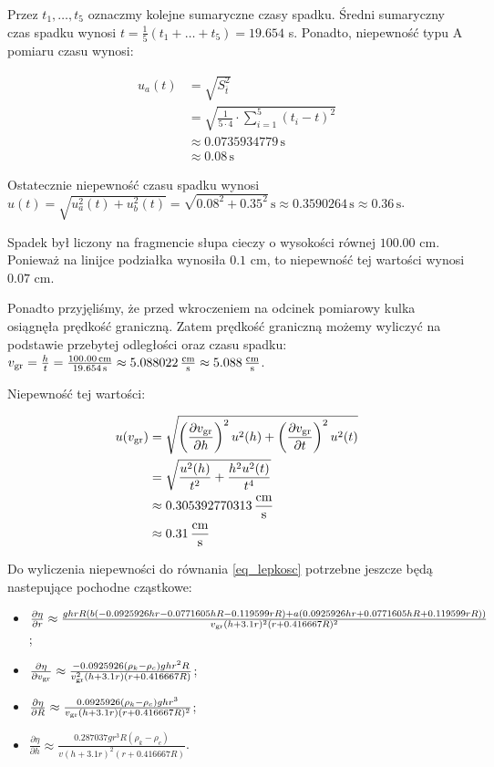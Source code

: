 \documentclass[a4paper]{article}
\begin{document}
Przez $t_1, \dots, t_5$ oznaczmy kolejne sumaryczne czasy spadku.
Średni sumaryczny czas spadku wynosi $t = \frac 1 5 (t_1 + \dots + t_5) = 19.654$ s.
Ponadto, niepewność typu A pomiaru czasu wynosi:

\begin{align*}
	u_a(t) &= \sqrt{S^{2}_{\overline{t}}} \\
	&= \sqrt{\frac{1}{5 \cdot 4} \cdot \sum_{i=1}^{5} (t_i - t)^2} \\
	&\approx 0.0735934779 \, \text{s} \\
	&\approx 0.08 \, \text{s}
\end{align*}

Ostatecznie niepewność czasu spadku wynosi $u(t) = \sqrt{u_a^2(t) + u_b^2(t)} = \sqrt{0.08^2 + 0.35^2} \, \text{s} \approx 0.3590264 \, \text{s} \approx 0.36\, \text{s}$.

Spadek był liczony na fragmencie słupa cieczy o wysokości równej $100.00$ cm.
Ponieważ na linijce podziałka wynosiła $0.1$ cm, to niepewność tej wartości wynosi $0.07$ cm.

Ponadto przyjęliśmy, że przed wkroczeniem na odcinek pomiarowy kulka osiągnęła prędkość graniczną.
Zatem prędkość graniczną możemy wyliczyć na podstawie przebytej odległości oraz czasu spadku:
$v_{\text{gr}} = \frac{h}{t} = \frac{100.00 \, \text{cm}}{19.654 \, \text{s}} \approx 5.088022 \, \frac{\text{cm}}{\text{s}} \approx 5.088 \, \frac{\text{cm}}{\text{s}}$.

Niepewność tej wartości:

\begin{align*}
	u(v_{\text{gr}}) &= \sqrt{\left(\frac{\partial v_{\text{gr}}}{\partial h}\right)^2 u^2(h) + \left(\frac{\partial v_{\text{gr}}}{\partial t}\right)^2 u^2(t)} \\
	&= \sqrt{\frac{u^2(h)}{t^2} + \frac{h^2 u^2(t)}{t^4}} \\
	&\approx 0.305392770313 \, \frac{\text{cm}}{\text{s}} \\
	&\approx 0.31 \, \frac{\text{cm}}{\text{s}}
\end{align*}

Do wyliczenia niepewności do równania \ref{eq_lepkosc} potrzebne jeszcze będą nastepujące pochodne cząstkowe:

\begin{itemize}
	\item $\frac{\partial \eta}{\partial r} \approx \frac{g h r R (b (-0.0925926 h r - 0.0771605 h R - 0.119599 r R) + a (0.0925926 h r + 0.0771605 h R + 0.119599 r R))}{v_{\text{gr}} (h + 3.1r)^2 (r + 0.416667 R)^2}$;
	\item $\frac{\partial \eta}{\partial v_{\text{gr}}} \approx \frac{-0.0925926(\rho_k - \rho_c) g h r^2 R}{v_{\text{gr}}^2 (h + 3.1r)(r + 0.416667R)}$;
	\item $\frac{\partial \eta}{\partial R} \approx \frac{0.0925926(\rho_k - \rho_c) g h r^3}{v_{\text{gr}} (h + 3.1r)(r + 0.416667 R)^2}$;
	\item $\frac{\partial \eta}{\partial h} \approx \frac{0.287037 g r^3 R (\rho_k - \rho_c)}{v(h + 3.1r)^2 (r + 0.416667 R)}$.
\end{itemize}
\end{document}

